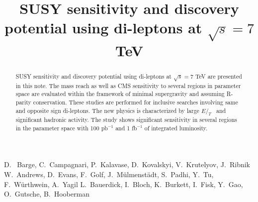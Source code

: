 \documentclass{cmspaper}
\newcommand{\met} {\ensuremath{E\!\!\!\!/_T}}
\begin{document}
%
\begin{titlepage}
\title{SUSY sensitivity and discovery potential using di-leptons at $\sqrt{s} = 7 $ TeV}

  \begin{Authlist}
    D.~ Barge, C.~Campagnari, P.~Kalavase, D.~Kovalskyi, V.~Krutelyov, J.~Ribnik
    W.~Andrews, D.~Evans, F.~Golf, J.~M\"ulmenst\"adt, S.~Padhi, Y.~Tu, F.~W\"urthwein, A.~Yagil
    L.~Bauerdick, I.~Bloch, K.~Burkett, I.~Fisk, Y.~Gao, O.~Gutsche, B.~Hooberman
  \end{Authlist}

\begin{abstract}
SUSY sensitivity and discovery potential using di-leptons at $\sqrt{s} = 7 $ TeV
are presented in this note. The mass reach as well as CMS sensitivity to several regions in
parameter space are evaluated within the framework of minimal supergravity and assuming R-parity
conservation. These studies are performed for inclusive searches involving same and opposite 
sign di-leptons. The new physics is characterized by large \met~ and significant hadronic 
activity. The study shows significant sensitivity in several regions in the parameter 
space with 100 pb$^{-1}$ and 1 fb$^{-1}$ of integrated luminosity.
\end{abstract}
\end{titlepage}




%



\clearpage

\clearpage

\end{document}
